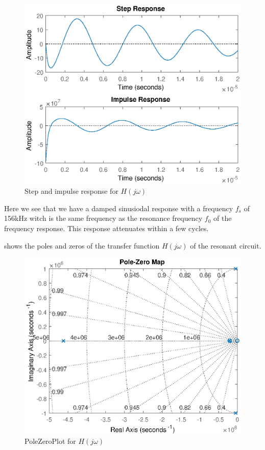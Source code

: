 \begin{figure}[H]
    \centering
    \includegraphics[width=\textwidth]{img/CoilRigResponse.eps}
    \caption{Step and impulse response for $H(j\omega)$}
    \label{fig:step}
\end{figure}

Here we see that we have a damped sinusiodal response with a frequency $f_s$ of 156kHz witch is the same frequency as the resonance frequency $f_0$ of the frequency response. This response attenuates within a few cycles.

 shows the poles and zeros of the transfer function $H(j\omega)$ of the resonant circuit.

\begin{figure}[H]
    \centering
    \includegraphics[width=\textwidth]{img/CoilRigPoleZeroPlot.eps}
    \caption{PoleZeroPlot for $H(j\omega)$}
    \label{fig:polezero}
\end{figure}

